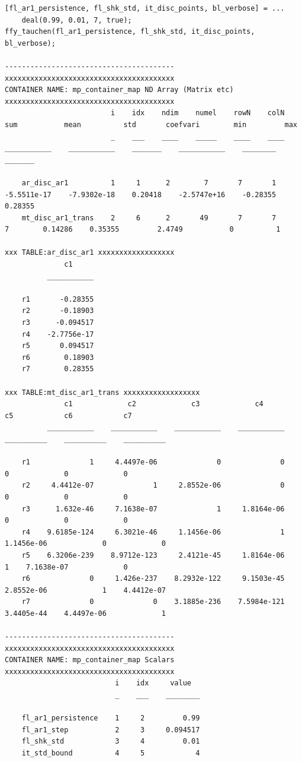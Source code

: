 \documentclass[
]{book}
\begin{document}
\begin{verbatim}
[fl_ar1_persistence, fl_shk_std, it_disc_points, bl_verbose] = ...
    deal(0.99, 0.01, 7, true);
ffy_tauchen(fl_ar1_persistence, fl_shk_std, it_disc_points, bl_verbose);

----------------------------------------
xxxxxxxxxxxxxxxxxxxxxxxxxxxxxxxxxxxxxxxx
CONTAINER NAME: mp_container_map ND Array (Matrix etc)
xxxxxxxxxxxxxxxxxxxxxxxxxxxxxxxxxxxxxxxx
                         i    idx    ndim    numel    rowN    colN        sum           mean          std       coefvari        min         max  
                         _    ___    ____    _____    ____    ____    ___________    ___________    _______    ___________    ________    _______

    ar_disc_ar1          1     1      2        7       7       1      -5.5511e-17    -7.9302e-18    0.20418    -2.5747e+16    -0.28355    0.28355
    mt_disc_ar1_trans    2     6      2       49       7       7                7        0.14286    0.35355         2.4749           0          1

xxx TABLE:ar_disc_ar1 xxxxxxxxxxxxxxxxxx
              c1     
          ___________

    r1       -0.28355
    r2       -0.18903
    r3      -0.094517
    r4    -2.7756e-17
    r5       0.094517
    r6        0.18903
    r7        0.28355

xxx TABLE:mt_disc_ar1_trans xxxxxxxxxxxxxxxxxx
              c1             c2             c3             c4             c5            c6            c7    
          ___________    ___________    ___________    ___________    __________    __________    __________

    r1              1     4.4497e-06              0              0             0             0             0
    r2     4.4412e-07              1     2.8552e-06              0             0             0             0
    r3      1.632e-46     7.1638e-07              1     1.8164e-06             0             0             0
    r4    9.6185e-124     6.3021e-46     1.1456e-06              1    1.1456e-06             0             0
    r5    6.3206e-239    8.9712e-123     2.4121e-45     1.8164e-06             1    7.1638e-07             0
    r6              0     1.426e-237    8.2932e-122     9.1503e-45    2.8552e-06             1    4.4412e-07
    r7              0              0    3.1885e-236    7.5984e-121    3.4405e-44    4.4497e-06             1

----------------------------------------
xxxxxxxxxxxxxxxxxxxxxxxxxxxxxxxxxxxxxxxx
CONTAINER NAME: mp_container_map Scalars
xxxxxxxxxxxxxxxxxxxxxxxxxxxxxxxxxxxxxxxx
                          i    idx     value  
                          _    ___    ________

    fl_ar1_persistence    1     2         0.99
    fl_ar1_step           2     3     0.094517
    fl_shk_std            3     4         0.01
    it_std_bound          4     5            4
\end{verbatim}
\end{document}
